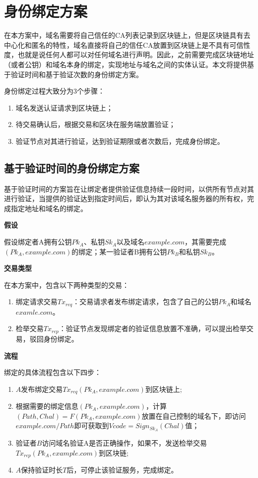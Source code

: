 \section{身份绑定方案}

在本方案中，域名需要将自己信任的CA列表记录到区块链上，但是区块链具有去中心化和匿名的特性，域名直接将自己的信任CA放置到区块链上是不具有可信性度，也就是说任何人都可以对任何域名进行声明。因此，之前需要完成区块链地址（或者公钥）和域名本身的绑定，实现地址与域名之间的实体认证。本文将提供基于验证时间和基于验证次数的身份绑定方案。

身份绑定过程大致分为3个步骤：

\begin{enumerate}
	\item 域名发送认证请求到区块链上；
	\item 待交易确认后，根据交易和区块在服务端放置验证；
	\item 验证节点对其进行验证，达到验证期限或者次数后，完成身份绑定。
\end{enumerate}

\subsection{基于验证时间的身份绑定方案}

基于验证时间的方案旨在让绑定者提供验证信息持续一段时间，以供所有节点对其进行验证，当提供的验证达到指定时间后，即认为其对该域名服务器的所有权，完成指定地址和域名的绑定。


\noindent\textbf{假设}

假设绑定者A拥有公钥$Pk_A$、私钥$Sk_A$以及域名$example.com$，其需要完成$(Pk_A, example.com)$的绑定；某一验证者B拥有公钥$Pk_B$和私钥$Sk_B$。


\noindent\textbf{交易类型}

在本方案中，包含以下两种类型的交易：

\begin{enumerate}
	\item 绑定请求交易$Tx_{req}$：交易请求者发布绑定请求，包含了自己的公钥$Pk_A$和域名$examle.com$。
	\item 检举交易$Tx_{rep}$：验证节点发现绑定者的验证信息放置不准确，可以提出检举交易，驳回身份绑定。
\end{enumerate}

\noindent\textbf{流程}

绑定的具体流程包含以下四步：

\begin{enumerate}
	\item $A$发布绑定交易$Tx_{req}(Pk_A, example.com)$到区块链上;
	\item 根据需要的绑定信息$(Pk_A, example.com)$，计算$(Path, Chal) = F(Pk_A, example.com)$放置在自己控制的域名下，即访问$example.com/Path$即可获取到$Vcode = Sign_{Sk_A}(Chal)$值；
	\item 验证者$B$访问域名验证A是否正确操作，如果不，发送检举交易$Tx_{rep}(Pk_A, example.com)$到区块链;
	\item $A$保持验证时长$T$后，可停止该验证服务，完成绑定。
\end{enumerate}

